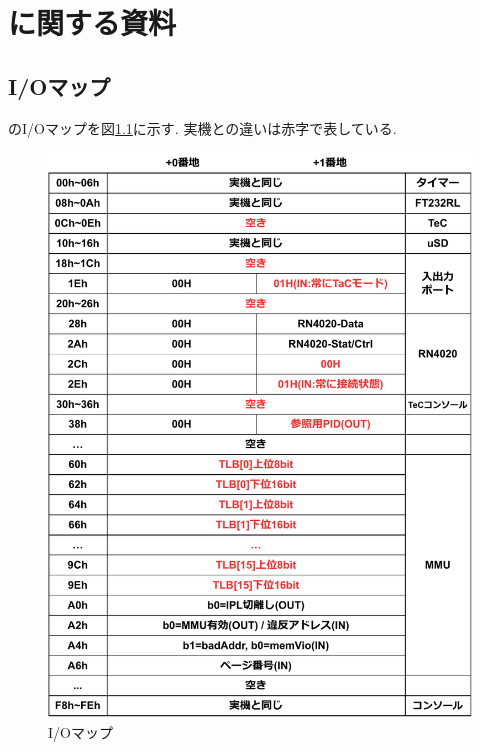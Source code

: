 \chapter{\tacsim に関する資料}
\label{appB}

\section{I/Oマップ}
\tacsim のI/Oマップを図\ref{fig:appB-io}に示す. \tac 実機との違いは赤字で表している.

\begin{figure}[H]
    \centering
    \includegraphics[width=14cm]{figs/appB.pdf}
    \caption{I/Oマップ} \label{fig:appB-io}
\end{figure}
